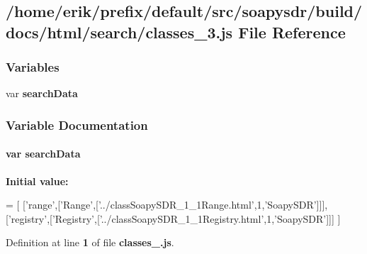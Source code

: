 \subsection{/home/erik/prefix/default/src/soapysdr/build/docs/html/search/classes\+\_\+3.js File Reference}
\label{classes__3_8js}
\subsubsection*{Variables}
\begin{DoxyCompactItemize}
\item 
var {\bf search\+Data}
\end{DoxyCompactItemize}


\subsubsection{Variable Documentation}
\paragraph[{search\+Data}]{\setlength{\rightskip}{0pt plus 5cm}var search\+Data}\label{classes__3_8js_ad01a7523f103d6242ef9b0451861231e}
{\bfseries Initial value\+:}
\begin{DoxyCode}
=
[
  [\textcolor{stringliteral}{'range'},[\textcolor{stringliteral}{'Range'},[\textcolor{stringliteral}{'../classSoapySDR\_1\_1Range.html'},1,\textcolor{stringliteral}{'SoapySDR'}]]],
  [\textcolor{stringliteral}{'registry'},[\textcolor{stringliteral}{'Registry'},[\textcolor{stringliteral}{'../classSoapySDR\_1\_1Registry.html'},1,\textcolor{stringliteral}{'SoapySDR'}]]]
]
\end{DoxyCode}


Definition at line {\bf 1} of file {\bf classes\+\_.\+js}.

